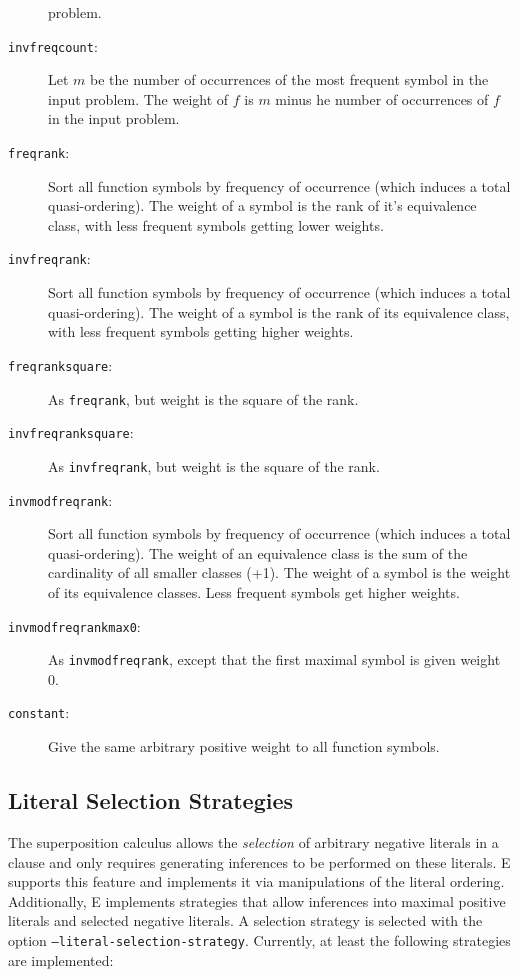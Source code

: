 \documentclass{article}
\begin{document}
\begin{description}
  problem. 
\item[\texttt{invfreqcount}:]  Let $m$ be the number of occurrences of
  the most frequent symbol in the input problem. The weight of $f$ is
  $m$ minus he number of occurrences of $f$ in the input problem.
\item[\texttt{freqrank}:] Sort all function symbols by frequency of
  occurrence (which induces a total quasi-ordering). The weight of a
  symbol is the rank of it's equivalence class, with less frequent
  symbols getting lower weights.
\item[\texttt{invfreqrank}:] Sort all function symbols by frequency of
  occurrence (which induces a total quasi-ordering). The weight of a
  symbol is the rank of its equivalence class, with less frequent
  symbols getting higher weights.
\item[\texttt{freqranksquare}:] As \texttt{freqrank}, but weight is
  the square of the rank.
\item[\texttt{invfreqranksquare}:] As \texttt{invfreqrank}, but weight is
  the square of the rank.
\item[\texttt{invmodfreqrank}:] Sort all function symbols by frequency of
  occurrence (which induces a total quasi-ordering). The weight of an
   equivalence class is the sum of the cardinality of all smaller
  classes (+1). The weight of a symbol is the weight of its
  equivalence classes. Less frequent symbols get higher weights.
\item[\texttt{invmodfreqrankmax0}:] As \texttt{invmodfreqrank}, except
  that the first maximal symbol is given weight 0.
\item[\texttt{constant}:] Give the same arbitrary positive weight to
  all function symbols.
\end{description}


\subsection{Literal Selection Strategies}
\label{sec:options:strategies}

The superposition calculus allows the \emph{selection} of arbitrary
negative literals in a clause and only requires generating inferences
to be performed on these literals. E supports this feature and
implements it via manipulations of the literal ordering. Additionally,
E implements strategies that allow inferences into maximal positive
literals and selected negative literals. A selection strategy is
selected with the option \texttt{--literal-selection-strategy}.
Currently, at least the following strategies are implemented:
\end{document}

